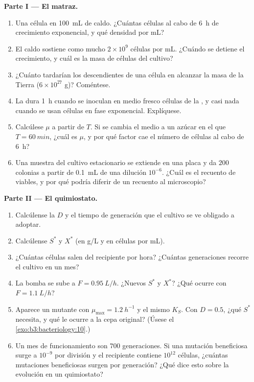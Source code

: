 \begin{problem}
\medskip
\noindent\textbf{Parte I --- El matraz.}
\begin{enumerate}
  \item Una célula en \qty{100}{mL} de caldo. ¿Cuántas células al cabo
        de \qty{6}{h} de crecimiento exponencial, y qué densidad por mL?
  \item El caldo sostiene como mucho $2\times 10^{9}$ células por mL.
        ¿Cuándo se detiene el crecimiento, y cuál es la masa de células
        del cultivo?
  \item ¿Cuánto tardarían los descendientes de una célula en alcanzar la
        masa de la Tierra ($6\times 10^{27}$ g)? Coméntese.
  \item La  dura \qty{1}{h} cuando se inoculan en medio
        fresco células de la , y casi nada cuando se
        usan células en fase exponencial. Explíquese.
  \item Calcúlese $\mu$ a partir de $T$. Si se cambia el medio a un
        azúcar en el que $T = \qty{60}{min}$, ¿cuál es $\mu$, y por qué
        factor cae el número de células al cabo de \qty{6}{h}?
  \item Una muestra del cultivo estacionario se extiende en una placa y
        da $200$ colonias a partir de \qty{0.1}{mL} de una dilución
        $10^{-6}$. ¿Cuál es el recuento de viables, y por qué podría
        diferir de un recuento al microscopio?
\end{enumerate}

\medskip
\noindent\textbf{Parte II --- El quimiostato.}
\begin{enumerate}[resume]
  \item Calcúlense la  $D$ y el tiempo de generación que
        el cultivo se ve obligado a adoptar.
  \item Calcúlense $S^{*}$ y $X^{*}$ (en g/L y en células por mL).
  \item ¿Cuántas células salen del recipiente por hora? ¿Cuántas
        generaciones recorre el cultivo en un mes?
  \item La bomba se sube a $F = \qty{0.95}{L/h}$. ¿Nuevos $S^{*}$ y
        $X^{*}$? ¿Qué ocurre con $F = \qty{1.1}{L/h}$?
  \item Aparece un mutante con $\mu_{\max} = \qty{1.2}{h^{-1}}$ y el
        mismo $K_{S}$. Con $D = 0.5$, ¿qué $S^{*}$ necesita, y qué le
        ocurre a la cepa original? (Úsese el
        \cref{exo:b3:bacteriology:10}.)
  \item Un mes de funcionamiento son $700$ generaciones. Si una mutación
        beneficiosa surge a $10^{-9}$ por división y el recipiente
        contiene $10^{12}$ células, ¿cuántas mutaciones beneficiosas
        surgen por generación? ¿Qué dice esto sobre la evolución en un
        quimiostato?
\end{enumerate}


\end{problem}
